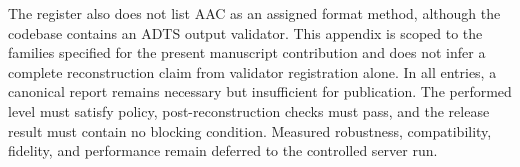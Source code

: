 The register also does not list AAC as an assigned format method, although the
codebase contains an ADTS output validator.  This appendix is scoped to the
families specified for the present manuscript contribution and does not infer
a complete reconstruction claim from validator registration alone.  In all
entries, a canonical report remains necessary but insufficient for
publication.  The performed level must satisfy policy, post-reconstruction
checks must pass, and the release result must contain no blocking condition.
Measured robustness, compatibility, fidelity, and performance remain deferred
to the controlled server run.
